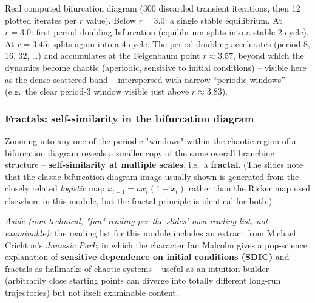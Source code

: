 \documentclass[11pt,a4paper]{article}
\begin{document}
\begin{figbox}[title={Bifurcation diagram: the period-doubling route to chaos (logistic map $x_{n+1}=r\,x_n(1-x_n)$)}]

\vspace{1mm}
\footnotesize Real computed bifurcation diagram (300 discarded transient iterations, then 12 plotted iterates per $r$ value). Below $r=3.0$: a single stable equilibrium. At $r=3.0$: first period-doubling bifurcation (equilibrium splits into a stable 2-cycle). At $r=3.45$: splits again into a 4-cycle. The period-doubling accelerates (period 8, 16, 32, \ldots) and accumulates at the Feigenbaum point $r\approx3.57$, beyond which the dynamics become chaotic (aperiodic, sensitive to initial conditions) -- visible here as the dense scattered band -- interspersed with narrow ``periodic windows'' (e.g.\ the clear period-3 window visible just above $r\approx3.83$).
\end{figbox}

\subsubsection*{Fractals: self-similarity in the bifurcation diagram}
Zooming into any one of the periodic "windows" within the chaotic region of a bifurcation diagram reveals a smaller copy of the same overall branching structure -- \textbf{self-similarity at multiple scales}, i.e.\ a \textbf{fractal}. (The slides note that the classic bifurcation-diagram image usually shown is generated from the closely related \emph{logistic} map $x_{t+1}=ax_t(1-x_t)$ rather than the Ricker map used elsewhere in this module, but the fractal principle is identical for both.)

\textit{Aside (non-technical, "fun" reading per the slides' own reading list, not examinable):} the reading list for this module includes an extract from Michael Crichton's \emph{Jurassic Park}, in which the character Ian Malcolm gives a pop-science explanation of \textbf{sensitive dependence on initial conditions (SDIC)} and fractals as hallmarks of chaotic systems -- useful as an intuition-builder (arbitrarily close starting points can diverge into totally different long-run trajectories) but not itself examinable content.
\end{document}
